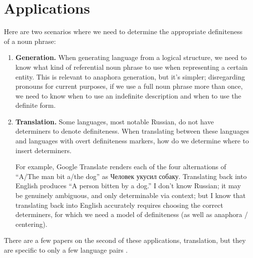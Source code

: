 \documentclass[11pt]{article}
\begin{document}
\section{Applications}
Here are two scenarios where we need to determine the appropriate definiteness of a noun phrase:
\begin{enumerate}
  \item \textbf{Generation.} When generating language from a logical structure, we need to know what kind of referential noun phrase to use when representing a certain entity. This is relevant to anaphora generation, but it's simpler; disregarding pronouns for current purposes, if we use a full noun phrase more than once, we need to know when to use an indefinite description and when to use the definite form.

  \item \textbf{Translation.} Some languages, most notable Russian, do not have determiners to denote definiteness. When translating between these languages and languages with overt definiteness markers, how do we determine where to insert determiners.

  For example, Google Translate renders each of the four alternations of ``A/The man bit a/the dog'' as \foreignlanguage{russian}{Человек укусил собаку.} Translating back into English produces ``A person bitten by a dog.'' I don't know Russian; it may be genuinely ambiguous, and only determinable via context; but I know that translating back into English accurately requires choosing the correct determiners, for which we need a model of definiteness (as well as anaphora / centering).
\end{enumerate}

\noindent
There are a few papers on the second of these applications, translation, but they are specific to only a few language pairs \citep{ishikawa:1995, siegel:1996}.
\end{document}
